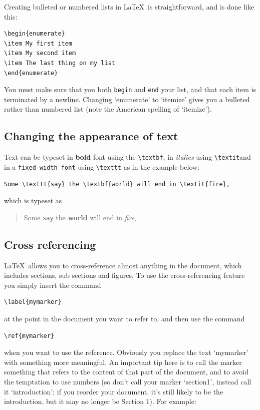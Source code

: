 \begin{refsection}
Creating bulleted or numbered lists in \LaTeX\ is straightforward, and is done like this:

\begin{verbatim}
\begin{enumerate}
\item My first item
\item My second item
\item The last thing on my list
\end{enumerate}
\end{verbatim}
%
You must make sure that you both \texttt{begin} and \texttt{end} your list, and that each item is terminated by a newline. Changing `enumerate' to `itemize' gives you a bulleted rather than numbered list (note the American spelling of `itemize').  

\subsection{Changing the appearance of text}
Text can be typeset in \textbf{bold} font using the \verb|\textbf|, in \textit{italics} using \verb|\textit|and in a \texttt{fixed-width font}  using \verb+\texttt+ as in the example below:

\begin{verbatim}
Some \texttt{say} the \textbf{world} will end in \textit{fire},
\end{verbatim}

which is typeset as

\begin{quote}
Some \texttt{say} the \textbf{world} will end in \textit{fire},  
\end{quote}
\subsection{Cross referencing}

\LaTeX\ allows you to cross-reference almost anything in the document, which includes sections, sub sections and figures. To use the cross-referencing feature you simply insert the command 
\begin{verbatim}
\label{mymarker}
\end{verbatim}
at the point in the document you want to refer to, and then use the command

\begin{verbatim}
\ref{mymarker}
\end{verbatim}
when you want to use the reference. Obviously you replace the text `mymarker' with something more meaningful. An important tip here is to call the marker something that refers to the content of that part of the document, and to avoid the temptation to use numbers (so don't call your marker `section1', instead call it `introduction'; if you reorder your document, it's still likely to be the introduction, but it may no longer be Section 1). For example:


\end{refsection}
